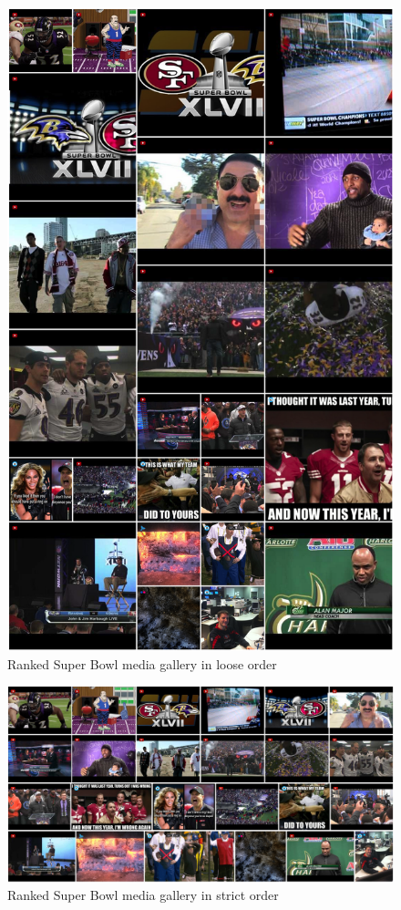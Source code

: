 \begin{figure}[htb]
  \centering
  \includegraphics[width=0.75\linewidth]{loose_order.png}
  \caption[Ranked Super Bowl media gallery in loose order]
  {Ranked Super Bowl media gallery in loose order}
  \label{fig:loose_order}
\end{figure}

\begin{figure}
  \centering
  \includegraphics[width=0.75\linewidth]{strict_order.png}
  \caption[Ranked Super Bowl media gallery in strict order]
  {Ranked Super Bowl media gallery in strict order }
  \label{fig:strict_order}
\end{figure}  

